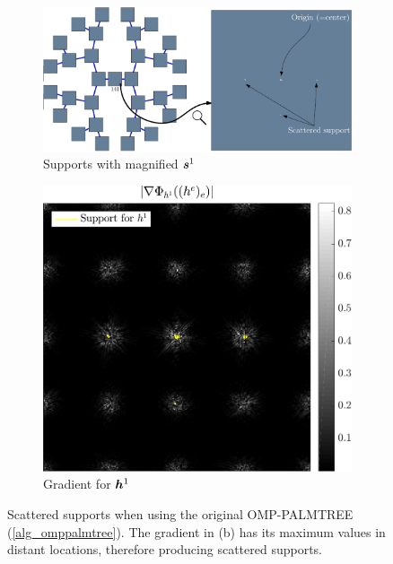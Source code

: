 \begin{figure}[!ht] \centering
\begin{subfigure}[b]{0.65\textwidth}\centering
\includegraphics[width=1\textwidth]{figures/tree-scattered-supports/supports_with_zoom.pdf}
\caption{Supports with magnified $\bm{s}^1$}\label{fig_scattered_support-tree}
\end{subfigure}
\begin{subfigure}[b]{0.34\textwidth}\centering
\includegraphics[width=1\textwidth]{figures/tree-scattered-supports/_partgrad1.pdf}
\caption{Gradient for $\bm{h}^1$}\label{fig_scattered_support-grad}
\end{subfigure}
\caption{Scattered supports when using the original OMP-PALMTREE (\cref{alg_omppalmtree}). The gradient in (b) has its maximum values in distant locations, therefore producing scattered supports.}\label{fig_scattered_support}
\end{figure}

